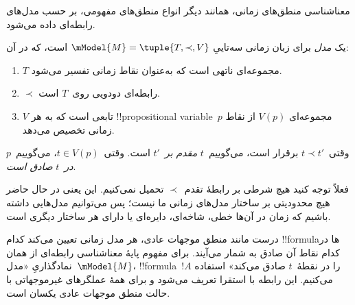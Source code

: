 \documentclass[../../../include/open-logic-section]{subfiles}
\begin{document}
معناشناسی منطق‌های زمانی، همانند دیگر انواع منطق‌های مفهومی، بر حسب
مدل‌های رابطه‌ای داده می‌شود.

\begin{defn}
  یک \emph{مدل} برای زبان زمانی سه‌تاییِ
  $\mModel{M} = \tuple{T, \prec, V}$ است، که در آن:
  \begin{enumerate}
  \item $T$ مجموعه‌ای ناتهی است که به‌عنوان نقاط زمانی تفسیر می‌شود.
  \item $\prec$ رابطه‌ای دودویی روی~$T$ است.
  \item $V$ تابعی است که به هر !!{propositional variable}~$p$ مجموعه‌ای
    $V(p)$ از نقاط زمانی تخصیص می‌دهد.
  \end{enumerate}
  وقتی~$t \prec t'$ برقرار است، می‌گوییم~$t$ \emph{مقدم بر}~$t'$ است.
  وقتی~$t \in V(p)$، می‌گوییم~$p$ \emph{در}~$t$ \emph{صادق است}.
\end{defn}

فعلاً توجه کنید هیچ شرطی بر رابطهٔ تقدم~$\prec$ تحمیل نمی‌کنیم. این
یعنی در حال حاضر هیچ محدودیتی بر ساختار مدل‌های زمانی ما نیست؛ پس
می‌توانیم مدل‌هایی داشته باشیم که زمان در آن‌ها خطی، شاخه‌ای، دایره‌ای
یا دارای هر ساختار دیگری است.

درست مانند منطق موجهات عادی، هر مدل زمانی تعیین می‌کند کدام
!!{formula}ها در کدام نقاط آن صادق به شمار می‌آیند. برای مفهوم پایهٔ
معناشناسی رابطه‌ای از همان نمادگذاریِ «مدل~$\mModel{M}$،
!!{formula}~$!A$ را در نقطهٔ~$t$ صادق می‌کند» استفاده می‌کنیم. این
رابطه با استقرا تعریف می‌شود و برای همهٔ عملگرهای غیرموجهاتی با حالت
منطق موجهات عادی یکسان است.
\end{document}
